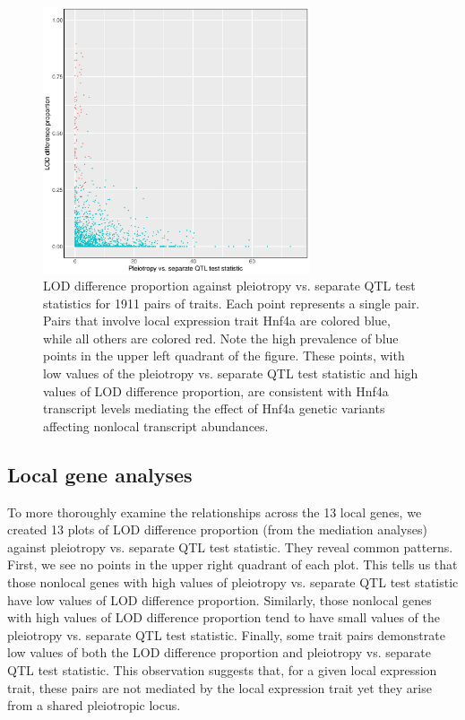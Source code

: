 \documentclass{article}
\begin{document}
\begin{boehm}
\begin{figure}
    \centering
    \includegraphics[width = 0.7\textwidth]{../Rmd/lod-diff-prop-v-lrt.eps}
    \caption{LOD difference proportion against pleiotropy vs. separate QTL test statistics for 1911 pairs of traits. Each point represents a single pair. Pairs that involve local expression trait Hnf4a are colored blue, while all others are colored red. Note the high prevalence of blue points in the upper left quadrant of the figure. These points, with low values of the pleiotropy vs. separate QTL test statistic and high values of LOD difference proportion, are consistent with Hnf4a transcript levels mediating the effect of Hnf4a genetic variants affecting nonlocal transcript abundances.}
    \label{fig:lod-diff-prop-v-lrt-all}
\end{figure}

\subsection{Local gene analyses}

To more thoroughly examine the relationships across the 13 local genes, we created 13 plots of LOD difference proportion (from the mediation analyses) against pleiotropy vs. separate QTL test statistic. They reveal common patterns. First, we see no points in the upper right quadrant of each plot. This tells us that those nonlocal genes with high values of pleiotropy vs. separate QTL test statistic have low values of LOD difference proportion. Similarly, those nonlocal genes with high values of LOD difference proportion tend to have small values of the pleiotropy vs. separate QTL test statistic. Finally, some trait pairs demonstrate low values of both the LOD difference proportion and pleiotropy vs. separate QTL test statistic. This observation suggests that, for a given local expression trait, these pairs are not mediated by the local expression trait yet they arise from a shared pleiotropic locus.


\end{boehm}
\end{document}
